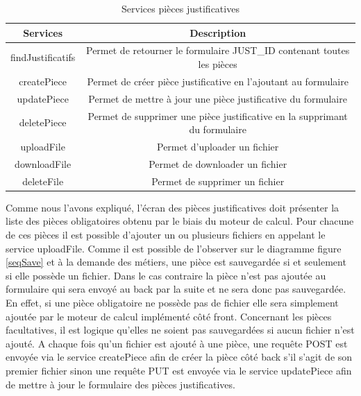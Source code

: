 \begin{table}[h!]
	\center
	\begin{tabular}{| c | c |}
     \hline
     Services & Description \\ \hline
     findJustificatifs & Permet de retourner le formulaire JUST\_ID contenant toutes les pièces \\ \hline
     createPiece & Permet de créer pièce justificative en l'ajoutant au formulaire \\ \hline
     updatePiece & Permet de mettre à jour une pièce justificative du formulaire \\ \hline
     deletePiece & Permet de supprimer une pièce justificative en la supprimant du formulaire \\ \hline
     uploadFile & Permet d'uploader un fichier \\ \hline
     downloadFile & Permet de downloader un fichier \\ \hline
     deleteFile & Permet de supprimer un fichier\\ \hline
	\end{tabular}
	\caption{Services pièces justificatives}
	\label{servicesPJ}
\end{table}

	Comme nous l'avons expliqué, l'écran des pièces justificatives doit présenter la liste des pièces obligatoires obtenu par le biais du moteur de calcul. Pour chacune de ces pièces il est possible d'ajouter un ou plusieurs fichiers en appelant le service uploadFile. Comme il est possible de l'observer sur le diagramme figure \ref{seqSave} et à la demande des métiers, une pièce est sauvegardée si et seulement si elle possède un fichier. Dans le cas contraire la pièce n'est pas ajoutée au formulaire qui sera envoyé au back par la suite et ne sera donc pas sauvegardée. En effet, si une pièce obligatoire ne possède pas de fichier elle sera simplement ajoutée par le moteur de calcul implémenté côté front. Concernant les pièces facultatives, il est logique qu'elles ne soient pas sauvegardées si aucun fichier n'est ajouté. A chaque fois qu'un fichier est ajouté à une pièce, une requête POST est envoyée via le service createPiece afin de créer la pièce côté back s'il s'agit de son premier fichier sinon une requête PUT est envoyée via le service updatePiece afin de mettre à jour le formulaire des pièces justificatives. \\

